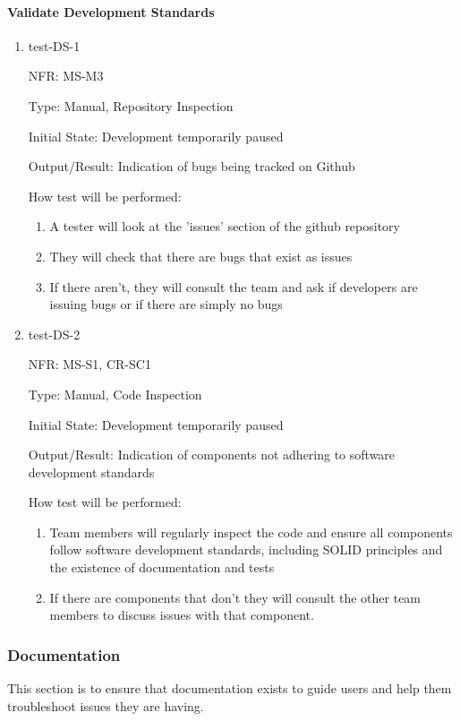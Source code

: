 \documentclass[12pt, titlepage]{article}
\begin{document}
\paragraph{Validate Development Standards}
\begin{enumerate}
  \item{test-DS-1}
  
  NFR: MS-M3

  Type: Manual, Repository Inspection

  Initial State: Development temporarily paused

  Output/Result: Indication of bugs being tracked on Github

  How test will be performed:
  \begin{enumerate}
    \item A tester will look at the 'issues' section of the github repository 
    \item They will check that there are bugs that exist as issues
    \item If there aren't, they will consult the team and ask if developers are
    issuing bugs or if there are simply no bugs
  \end{enumerate}


  \item{test-DS-2}
  
  NFR: MS-S1, CR-SC1

  Type: Manual, Code Inspection

  Initial State: Development temporarily paused

  Output/Result: Indication of components not adhering to software development standards

  How test will be performed:
  \begin{enumerate}
    \item Team members will regularly inspect the code and ensure all components follow software development standards, including SOLID principles and the existence of documentation and tests
    \item If there are components that don't they will consult the other team members to discuss issues with that component.
  \end{enumerate}
\end{enumerate}

\subsubsection{Documentation}
This section is to ensure that documentation exists to guide users and help them troubleshoot issues they are having.
\end{document}
